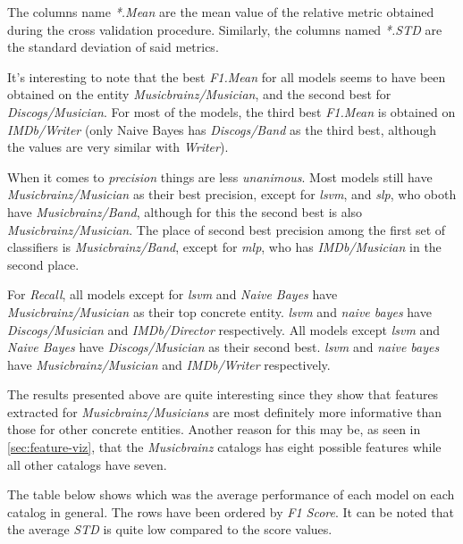 \documentclass[epsfig,a4paper,11pt,titlepage,twoside,openany]{book}
\begin{document}
The columns name \textit{*.Mean} are the mean value of the relative metric obtained during the cross validation procedure. Similarly, the columns named \textit{*.STD} are the standard deviation of said metrics. 

It's interesting to note that the best \textit{F1.Mean} for all models seems to have been obtained on the entity \textit{Musicbrainz/Musician}, and the second best for \textit{Discogs/Musician}. For most of the models, the third best \textit{F1.Mean} is obtained on \textit{IMDb/Writer} (only Naive Bayes has \textit{Discogs/Band} as the third best, although the values are very similar with \textit{Writer}).

When it comes to \textit{precision} things are less \textit{unanimous}. Most models still have \textit{Musicbrainz/Musician} as their best precision, except for \textit{lsvm}, and \textit{slp}, who oboth have \textit{Musicbrainz/Band}, although for this the second best is also \textit{Musicbrainz/Musician}. The place of second best precision among the first set of classifiers is \textit{Musicbrainz/Band}, except for \textit{mlp}, who has \textit{IMDb/Musician} in the second place. 

For \textit{Recall}, all models except for \textit{lsvm} and \textit{Naive Bayes} have \textit{Musicbrainz/Musician} as their top concrete entity. \textit{lsvm} and \textit{naive bayes} have \textit{Discogs/Musician} and \textit{IMDb/Director} respectively. All models except \textit{lsvm} and \textit{Naive Bayes} have \textit{Discogs/Musician} as their second best. \textit{lsvm} and \textit{naive bayes} have \textit{Musicbrainz/Musician} and \textit{IMDb/Writer} respectively.

The results presented above are quite interesting since they show that features extracted for \textit{Musicbrainz/Musicians} are most definitely more informative than those for other concrete entities. Another reason for this may be, as seen in \autoref{sec:feature-viz}, that the \textit{Musicbrainz} catalogs has eight possible features while all other catalogs have seven. 

The table below shows which was the average performance of each model on each catalog in general. The rows have been ordered by \textit{F1 Score}. It can be noted that the average \textit{STD} is quite low compared to the score values. 
\end{document}
